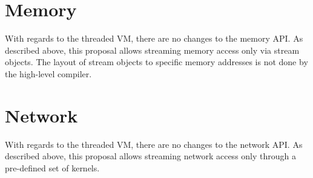 \section{Memory}

With regards to the threaded VM, there are no changes to the memory
API.  As described above, this proposal allows streaming memory access
only via stream objects.  The layout of stream objects to specific
memory addresses is not done by the high-level compiler.

\section{Network}

With regards to the threaded VM, there are no changes to the network
API. As described above, this proposal allows streaming network access
only through a pre-defined set of kernels.
